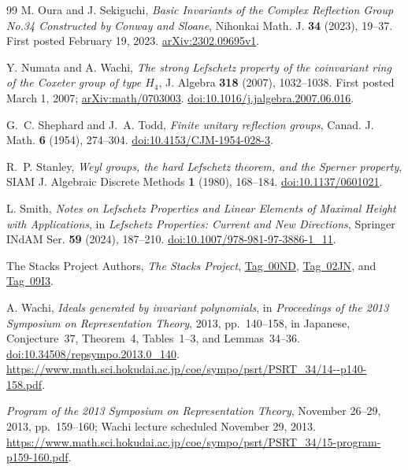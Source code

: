 \documentclass[11pt]{article}
\theoremstyle{definition}
\begin{document}
\begin{thebibliography}{99}
M. Oura and J. Sekiguchi,
\emph{Basic Invariants of the Complex Reflection Group No.34 Constructed by Conway and Sloane},
Nihonkai Math. J. \textbf{34} (2023), 19--37.
First posted February 19, 2023.
\href{https://arxiv.org/abs/2302.09695v1}{arXiv:2302.09695v1}.

Y. Numata and A. Wachi,
\emph{The strong Lefschetz property of the coinvariant ring of the Coxeter group of type $H_4$},
J. Algebra \textbf{318} (2007), 1032--1038.
First posted March 1, 2007;
\href{https://arxiv.org/abs/math/0703003}{arXiv:math/0703003}.
\href{https://doi.org/10.1016/j.jalgebra.2007.06.016}{doi:10.1016/j.jalgebra.2007.06.016}.

G.~C. Shephard and J.~A. Todd,
\emph{Finite unitary reflection groups},
Canad. J. Math. \textbf{6} (1954), 274--304.
\href{https://doi.org/10.4153/CJM-1954-028-3}{doi:10.4153/CJM-1954-028-3}.

R.~P. Stanley,
\emph{Weyl groups, the hard Lefschetz theorem, and the Sperner property},
SIAM J. Algebraic Discrete Methods \textbf{1} (1980), 168--184.
\href{https://doi.org/10.1137/0601021}{doi:10.1137/0601021}.

L. Smith,
\emph{Notes on Lefschetz Properties and Linear Elements of Maximal Height with Applications},
in \emph{Lefschetz Properties: Current and New Directions},
Springer INdAM Ser. \textbf{59} (2024), 187--210.
\href{https://doi.org/10.1007/978-981-97-3886-1_11}{doi:10.1007/978-981-97-3886-1\_11}.

The Stacks Project Authors, \emph{The Stacks Project},
\href{https://stacks.math.columbia.edu/tag/00ND}{Tag~00ND},
\href{https://stacks.math.columbia.edu/tag/02JN}{Tag~02JN}, and
\href{https://stacks.math.columbia.edu/tag/09I3}{Tag~09I3}.

A. Wachi, \emph{Ideals generated by invariant polynomials},
in \emph{Proceedings of the 2013 Symposium on Representation Theory},
2013, pp.~140--158, in Japanese, Conjecture~37, Theorem~4, Tables~1--3,
and Lemmas~34--36.
\href{https://doi.org/10.34508/repsympo.2013.0_140}{doi:10.34508/repsympo.2013.0\_140}.
\url{https://www.math.sci.hokudai.ac.jp/coe/sympo/psrt/PSRT_34/14--p140-158.pdf}.

\emph{Program of the 2013 Symposium on Representation Theory},
November 26--29, 2013, pp.~159--160; Wachi lecture scheduled
November 29, 2013.
\url{https://www.math.sci.hokudai.ac.jp/coe/sympo/psrt/PSRT_34/15-program-p159-160.pdf}.


\end{thebibliography}
\end{document}
